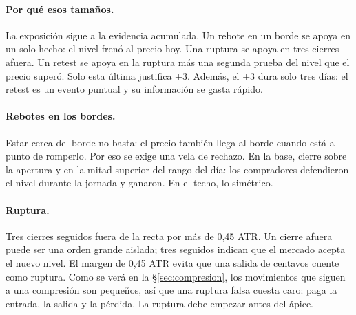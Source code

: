 \documentclass[10pt,a4paper]{article}
\begin{document}
\paragraph{Por qué esos tamaños.} La exposición sigue a la evidencia acumulada. Un
rebote en un borde se apoya en un solo hecho: el nivel frenó al precio hoy. Una
ruptura se apoya en tres cierres afuera. Un retest se apoya en la ruptura más una
segunda prueba del nivel que el precio superó. Solo esta última justifica $\pm3$.
Además, el $\pm3$ dura solo tres días: el retest es un evento puntual y su
información se gasta rápido.

\paragraph{Rebotes en los bordes.} Estar cerca del borde no basta: el precio
también llega al borde cuando está a punto de romperlo. Por eso se exige una vela
de rechazo. En la base, cierre sobre la apertura y en la mitad superior del rango
del día: los compradores defendieron el nivel durante la jornada y ganaron. En el
techo, lo simétrico.

\paragraph{Ruptura.} Tres cierres seguidos fuera de la recta por más de 0,45 ATR.
Un cierre afuera puede ser una orden grande aislada; tres seguidos indican que el
mercado acepta el nuevo nivel. El margen de 0,45 ATR evita que una salida de
centavos cuente como ruptura. Como se verá en la §\ref{sec:compresion}, los
movimientos que siguen a una compresión son pequeños, así que una ruptura falsa
cuesta caro: paga la entrada, la salida y la pérdida. La ruptura debe empezar antes
del ápice.
\end{document}
